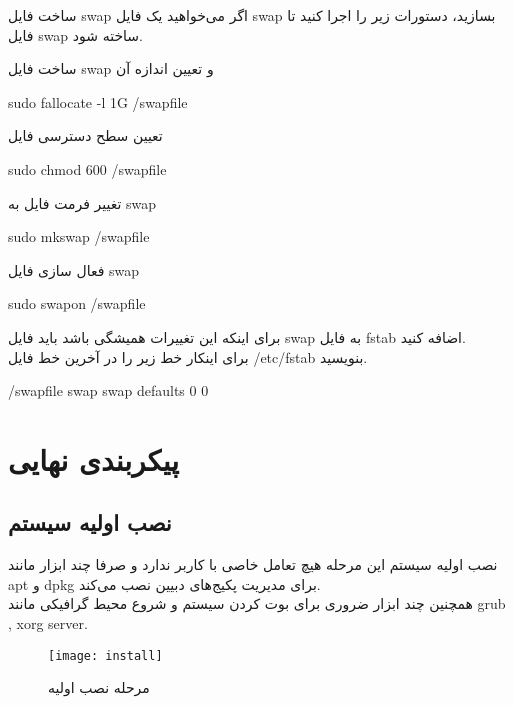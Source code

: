 \begin{frame}{ساخت فایل swap}
  اگر می‌خواهید یک فایل swap بسازید،‌ دستورات زیر را اجرا کنید تا فایل swap ساخته شود.
  \begin{alertblock}{ساخت فایل swap و تعیین اندازه آن}
    \begin{LTR}
      sudo fallocate -l 1G /swapfile
    \end{LTR}
  \end{alertblock}
  \begin{alertblock}{تعیین سطح دسترسی فایل}
    \begin{LTR}
      sudo chmod 600 /swapfile
    \end{LTR}
  \end{alertblock}
  \begin{alertblock}{تغییر فرمت فایل به swap}
    \begin{LTR}
      sudo mkswap /swapfile
    \end{LTR}
  \end{alertblock}
  \begin{alertblock}{فعال سازی فایل swap}
    \begin{LTR}
      sudo swapon /swapfile
    \end{LTR}
  \end{alertblock}  
  برای اینکه این تغییرات همیشگی باشد باید فایل swap به فایل fstab اضافه کنید.\\
  برای اینکار خط زیر را در آخرین خط فایل /etc/fstab بنویسید.
  \begin{LTR}
    /swapfile swap swap defaults 0 0
  \end{LTR}
\end{frame}
\section{پیکربندی نهایی}
\subsection{نصب اولیه سیستم}
\begin{frame}{نصب اولیه سیستم}
  این مرحله هیچ تعامل خاصی با کاربر ندارد و صرفا چند ابزار مانند apt و dpkg برای مدیریت پکیج‌های دبیین نصب می‌کند.\\
  همچنین چند ابزار ضروری برای بوت کردن سیستم و شروع محیط‌ گرافیکی مانند grub , xorg server.\\
  \begin{figure}
    \texttt{[image: install]}
    \caption{مرحله نصب اولیه~\cite{fig:deb_install}}
  \end{figure}
\end{frame}
